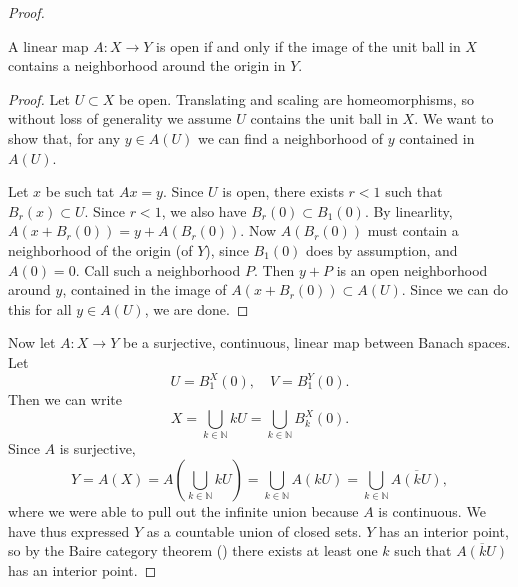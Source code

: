 \documentclass[12pt]{article}
\begin{document}
\begin{refsection}
\begin{proof}
	\begin{proposition}
		A linear map $A:X\to Y$ is open if and only if the image of the unit ball in $X$ contains a neighborhood around the origin in $Y$.
	\end{proposition}
	\begin{proof}
		Let $U\subset X$ be open. Translating and scaling are homeomorphisms, so without loss of generality we assume $U$ contains the unit ball in $X$. We want to show that, for any $y\in A(U)$ we can find a neighborhood of $y$ contained in $A(U)$.

		Let $x$ be such tat $Ax=y$. Since $U$ is open, there exists $r<1$ such that $B_r(x)\subset U$. Since $r<1$, we also have $B_r(0)\subset B_1(0)$. By linearlity, $A(x+B_r(0))=y+A(B_r(0))$. Now $A(B_r(0))$ must contain a neighborhood of the origin (of $Y$), since $B_1(0)$ does by assumption, and $A(0)=0$. Call such a neighborhood $P$. Then $y+P$ is an open neighborhood around $y$, contained in the image of $A(x+B_r(0))\subset A(U)$. Since we can do this for all $y\in A(U)$, we are done.
	\end{proof}

	Now let $A:X\to Y$ be a surjective, continuous, linear map between Banach spaces. Let 
	\begin{equation*}
		U=B_1^X(0), \quad V=B_1^Y(0).
	\end{equation*}
	Then we can write
	\begin{equation*}
		X=\bigcup_{k\in\mathbb{N}}kU = \bigcup_{k\in\mathbb{N}}B_k^X(0).
	\end{equation*}
	Since $A$ is surjective,
	\begin{equation*}
		Y=A(X)=A(\bigcup_{k\in\mathbb{N}}kU)=\bigcup_{k\in\mathbb{N}}A(kU)=\bigcup_{k\in\mathbb{N}}\overline{A(kU)},
	\end{equation*}
	where we were able to pull out the infinite union because $A$ is continuous. We have thus expressed $Y$ as a countable union of closed sets. $Y$ has an interior point, so by the Baire category theorem () there exists at least one $k$ such that $\overline{A(kU)}$ has an interior point. 


\end{proof}
\end{refsection}
\end{document}
